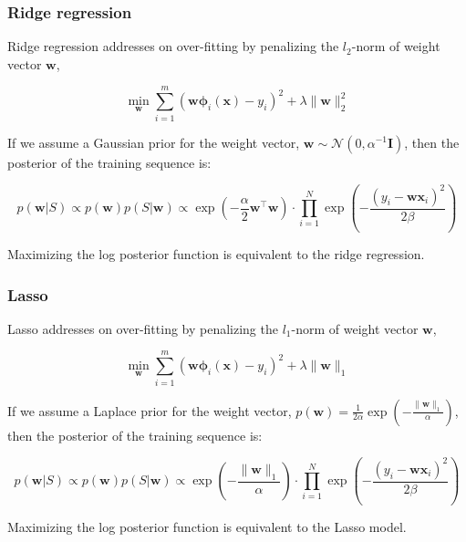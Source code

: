 \documentclass{article}
\begin{document}
\subsubsection{Ridge regression}

	Ridge regression addresses on over-fitting by penalizing the $l_2$-norm of weight vector $\mathbf{w}$,
	
	\begin{equation*}
	\min_\mathbf{w} \sum_{i=1}^m (\mathbf{w\phi}_i(\mathbf{x}) - y_i)^2 + \lambda\|\mathbf{w}\|^2_2
	\end{equation*}

	If we assume a Gaussian prior for the weight vector, $\mathbf{w}\sim\mathcal{N}(0,\alpha^{-1}\mathbf{I})$, then the posterior of the training sequence is:
	
	\begin{equation}
	p(\mathbf{w}|S) \propto p(\mathbf{w}) p(S|\mathbf{w}) \propto \exp \left( -\frac{\alpha}{2} \mathbf{w}^\top \mathbf{w} \right) \cdot \prod_{i=1}^N \exp \left( -\frac{(y_i-\mathbf{wx}_i)^2}{2\beta} \right) 
	\end{equation}
	
Maximizing the log posterior function is equivalent to the ridge regression.
	
	
\subsubsection{Lasso}

	Lasso addresses on over-fitting by penalizing the $l_1$-norm of weight vector $\mathbf{w}$,
		
	\begin{equation*}
	\min_\mathbf{w} \sum_{i=1}^m (\mathbf{w\phi}_i(\mathbf{x}) - y_i)^2 + \lambda\|\mathbf{w}\|_1
	\end{equation*}
	
	If we assume a Laplace prior for the weight vector, $p(\mathbf{w})=\frac{1}{2\alpha} \exp \left( -\frac{\|\mathbf{w}\|_1}{\alpha} \right)$, then the posterior of the training sequence is:
	
	\begin{equation}
	p(\mathbf{w}|S) \propto p(\mathbf{w}) p(S|\mathbf{w}) \propto \exp \left( -\frac{\|\mathbf{w}\|_1}{\alpha} \right) \cdot \prod_{i=1}^N \exp \left( -\frac{(y_i-\mathbf{wx}_i)^2}{2\beta} \right)
	\end{equation}

Maximizing the log posterior function is equivalent to the Lasso model.
\end{document}
